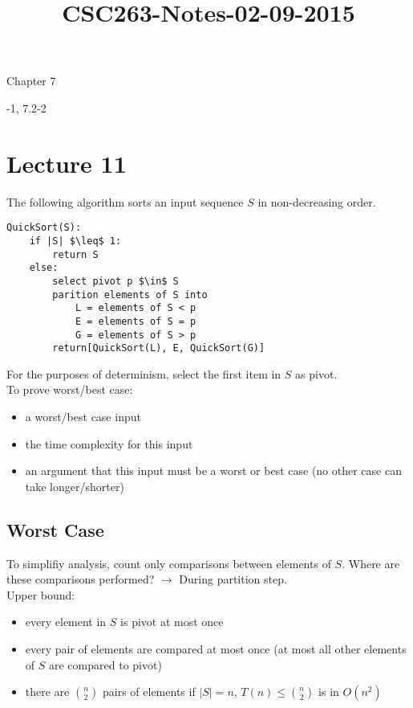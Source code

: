 



\title{CSC263-Notes-02-09-2015}



\reversemarginpar
\mpreadings

\noindent Chapter 7 \\

\mpselftest

-1, 7.2-2 \\

\section*{Lecture 11}

\noindent The following algorithm sorts an input sequence $S$ in non-decreasing order. \\

\begin{lstlisting}[mathescape]
QuickSort(S):
	if |S| $\leq$ 1: 
		return S
	else:
		select pivot p $\in$ S
		parition elements of S into
			L = elements of S < p
			E = elements of S = p
			G = elements of S > p
		return[QuickSort(L), E, QuickSort(G)]
\end{lstlisting}

\noindent For the purposes of determinism, select the first item in $S$ as pivot. \\

\noindent To prove worst/best case: 
\begin{itemize}
	\item a worst/best case input
	\item the time complexity for this input
	\item an argument that this input must be a worst or best case (no other case can take longer/shorter)
\end{itemize}

\subsection*{Worst Case}

\noindent To simplifiy analysis, count only comparisons between elements of $S$. Where are these comparisons performed? $\rightarrow$ During partition step. \\

\noindent Upper bound:
\begin{itemize}
	\item every element in $S$ is pivot at most once
	\item every pair of elements are compared at most once (at most all other elements of $S$ are compared to pivot)
	\item there are $n \choose 2$ pairs of elements if $|S| = n$, $T(n) \leq {n \choose 2}$ is in $O(n^2)$
\end{itemize}

